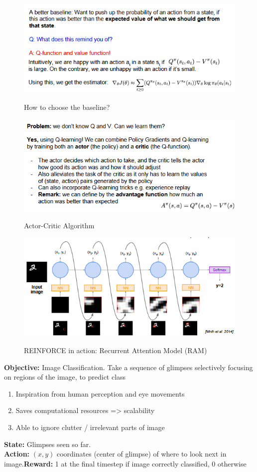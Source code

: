 \documentclass[11pt]{article}
\begin{document}
\begin{figure}[h]
\centering
\captionsetup{justification=centering}
\includegraphics[width=0.7\linewidth]{L1324.pdf}
\label{fig:1324}
\caption{How to choose the baseline? }
\end{figure}
\begin{figure}[h]
\centering
\captionsetup{justification=centering}
\includegraphics[width=0.7\linewidth]{L1325.pdf}
\label{fig:1325}
\caption{Actor-Critic Algorithm }
\end{figure}
\begin{figure}[h]
\centering
\captionsetup{justification=centering}
\includegraphics[width=0.7\linewidth]{L1326.pdf}
\label{fig:1326}
\caption{ REINFORCE in action: Recurrent Attention Model (RAM)}
\end{figure}
\clearpage
\textbf{Objective: }Image Classification. Take a sequence of glimpses selectively focusing on regions of the image, to predict class
\begin{enumerate}
    \item Inspiration from human perception and eye movements
    \item Saves computational resources => scalability
    \item Able to ignore clutter / irrelevant parts of image
\end{enumerate}{}
\textbf{State:} Glimpses seen so far.\\\textbf{Action:} $(x,y)$ coordinates (center of glimpse) of where to look next in image.\textbf{Reward:} 1 at the final timestep if image correctly classified, 0 otherwise
\end{document}
